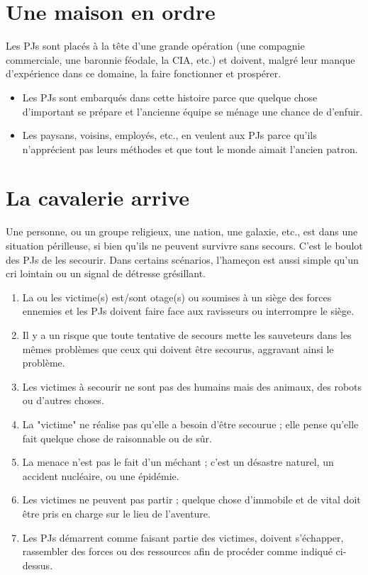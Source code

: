 \begin{multicols}{2}
\section{Une maison en ordre}
\label{maison}


Les PJs sont placés à la tête d'une grande opération (une compagnie commerciale, une baronnie féodale, la CIA, etc.) et doivent, malgré leur manque d'expérience dans ce domaine, la faire fonctionner et prospérer.

\themes
\begin{itemize}
\item Les PJs sont embarqués dans cette histoire parce que quelque chose d'important se prépare et l'ancienne équipe se ménage une chance de d'enfuir.
\item Les paysans, voisins, employés, etc., en veulent aux PJs parce qu'ils n'apprécient pas leurs méthodes et que tout le monde aimait l'ancien patron.
\end{itemize}

\section{La cavalerie arrive}
\label{cavalerie}


Une personne, ou un groupe religieux, une nation, une galaxie, etc., est dans une situation périlleuse, si bien qu'ils ne peuvent survivre sans secours. C'est le boulot des PJs de les secourir. Dans certains scénarios, l'hameçon est aussi simple qu'un cri lointain ou un signal de détresse grésillant.

\themes
\begin{enumerate}
\item La ou les victime(s) est/sont otage(s) ou soumises à un siège des forces ennemies et les PJs doivent faire face aux ravisseurs ou interrompre le siège.
\item Il y a un risque que toute tentative de secours mette les sauveteurs dans les mêmes problèmes que ceux qui doivent être secourus, aggravant ainsi le problème.
\item Les victimes à secourir ne sont pas des humains mais des animaux, des robots ou d'autres choses.
\item La "victime" ne réalise pas qu'elle a besoin d'être secourue ; elle pense qu'elle fait quelque chose de raisonnable ou de sûr.
\item La menace n'est pas le fait d'un méchant ; c'est un désastre naturel, un accident nucléaire, ou une épidémie.
\item Les victimes ne peuvent pas partir ; quelque chose d'immobile et de vital doit être pris en charge sur le lieu de l'aventure.
\item Les PJs démarrent comme faisant partie des victimes, doivent s'échapper, rassembler des forces ou des ressources afin de procéder comme indiqué ci-dessus.
\end{enumerate}


\end{multicols}
